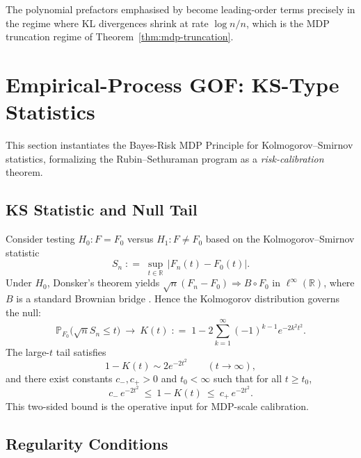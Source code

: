 \documentclass[11pt]{article}
\newcommand{\defeq}{\mathrel{\mathop:}=}
\newcommand{\R}{\mathbb{R}}
\newcommand{\1}{\mathbf{1}}
\newcommand{\PP}{\mathbb{P}}
\theoremstyle{plain}
\theoremstyle{definition}
\theoremstyle{remark}
\begin{document}
The polynomial prefactors emphasised by \citet{BahadurRao1960} become leading-order terms precisely in the regime where KL divergences shrink at rate $\log n/n$, which is the MDP truncation regime of Theorem~\ref{thm:mdp-truncation}.


\section{Empirical-Process GOF: KS-Type Statistics}
\label{sec:ks}

This section instantiates the Bayes-Risk MDP Principle for Kolmogorov--Smirnov statistics, formalizing the Rubin--Sethuraman program as a \emph{risk-calibration} theorem.

\subsection{KS Statistic and Null Tail}

Consider testing $H_0: F = F_0$ versus $H_1: F\neq F_0$ based on the Kolmogorov--Smirnov statistic
\begin{equation}\label{eq:ks-stat}
S_n \;\defeq\; \sup_{t\in\R}\,|F_n(t)-F_0(t)|.
\end{equation}
Under $H_0$, Donsker's theorem yields $\sqrt{n}(F_n-F_0)\Rightarrow B\circ F_0$ in $\ell^\infty(\R)$, where $B$ is a standard Brownian bridge \citep[see][for general empirical-process theory]{VaartWellner1996}.
Hence the Kolmogorov distribution governs the null:
\begin{equation}\label{eq:kolmogorov-dist}
\PP_{F_0}\!\big(\sqrt{n}S_n\le t\big)\ \to\ K(t)
\;\defeq\;
1-2\sum_{k=1}^\infty (-1)^{k-1}e^{-2k^2t^2}.
\end{equation}
The large-$t$ tail satisfies
\begin{equation}\label{eq:kolmogorov-tail}
1-K(t) \sim 2e^{-2t^2} \qquad (t\to\infty),
\end{equation}
and there exist constants $c_-,c_+>0$ and $t_0<\infty$ such that for all $t\ge t_0$,
\begin{equation}\label{eq:kolmogorov-tail-2sided}
c_-\,e^{-2t^2}\ \le\ 1-K(t)\ \le\ c_+\,e^{-2t^2}.
\end{equation}
This two-sided bound is the operative input for MDP-scale calibration.

\subsection{Regularity Conditions}
\end{document}

